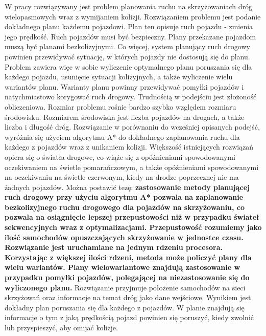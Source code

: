  \label{chap:thesis}

W pracy rozwiązywany jest problem planowania ruchu na skrzyżowaniach dróg wielopasmowych wraz z wymijaniem kolizji. Rozwiązaniem problemu jest podanie dokładnego planu każdemu pojazdowi. Plan ten opisuje ruch pojazdu - zmienia jego prędkość. Ruch pojazdów musi być bezpieczny. Plany przekazane pojazdom muszą być planami bezkolizyjnymi. Co więcej, system planujący ruch drogowy powinien przewidywać sytuację, w których pojazdy nie dostosują się do planu. Problem zawiera więc w sobie wyliczenie optymalnego planu poruszania się dla każdego pojazdu, usunięcie sytuacji kolizyjnych, a także wyliczenie wielu wariantów planu. Warianty planu powinny przewidywać pomyłki pojazdów i natychmiastowo korygować ruch drogowy. Trudnością w podejściu jest złożoność obliczeniowa. Rozmiar problemu rośnie bardzo szybko względem rozmiaru środowisku. Rozmiarem środowiska jest liczba pojazdów na drogach, a także liczba i długość dróg.
\newline
\indent
Rozwiązanie w porównaniu do wcześniej opisanych podejść, wyróżnia się użyciem algorytmu A* do dokładnego zaplanowania ruchu dla każdego z pojazdów wraz z unikaniem kolizji. Większość istniejących rozwiązań opiera się o światła drogowe, co wiąże się z opóźnieniami spowodowanymi oczekiwaniem na świetle pomarańczowym, a także opóźnieniami spowodowanymi na oczekiwaniu na świetle czerwonym, kiedy na drodze poprzecznej nie ma żadnych pojazdów.
\newline
\indent
Można postawić tezę: \textbf{zastosowanie metody planującej ruch drogowy przy użyciu algorytmu A* pozwala na zaplanowanie bezkolizyjnego ruchu drogowego dla pojazdów na skrzyżowaniu, co pozwala na osiągnięcie lepszej przepustowości niż w przypadku świateł sekwencyjnych wraz z optymalizacjami. Przepustowość rozumiemy jako ilość samochodów opuszczających skrzyżowanie w jednostce czasu. Rozwiązanie jest uruchamiane na jednym rdzeniu procesora. Korzystając z większej ilości rdzeni, metoda może policzyć plany dla wielu wariantów. Plany wielowariantowe znajdują zastosowanie w przypadku pomyłki pojazdów, polegającej na niezastosowanie się do wyliczonego planu.}
\newline
\indent
Rozwiązanie przyjmuje położenie samochodów na sieci skrzyżowań oraz informacje na temat dróg jako dane wejściowe. Wynikiem jest dokładny plan poruszania się dla każdego z pojazdów. W planie znajdują się informacje o tym z jaką prędkością pojazd powinien się poruszyć, kiedy zwolnić lub przyspieszyć, aby omijać kolizje.
